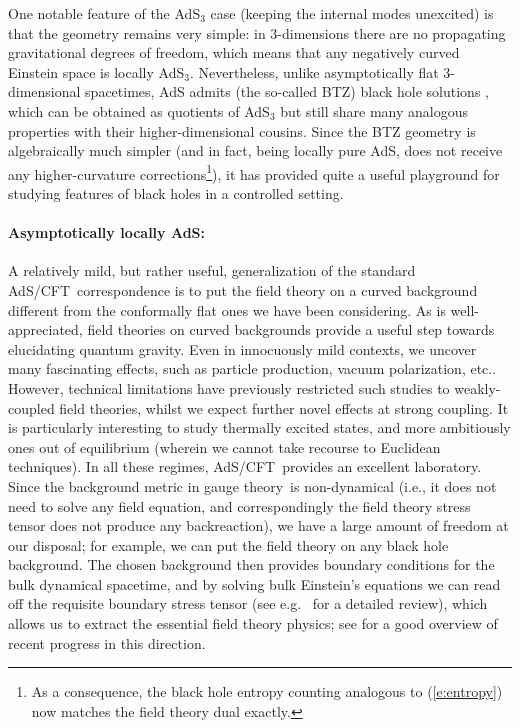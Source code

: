 \documentclass[12pt]{article}
\def\req#1{(\ref{#1})}
\def\AC{AdS/CFT}
\def\GT{gauge theory}
\begin{document}
One notable feature of the AdS$_3$ case (keeping the internal modes unexcited) is that the geometry remains very simple:  in 3-dimensions there are no propagating gravitational degrees of freedom, which means that any negatively curved Einstein space is locally AdS$_3$.  Nevertheless, unlike asymptotically flat 3-dimensional  spacetimes, AdS admits (the so-called BTZ) black hole solutions \cite{Banados:1992wn}, which can be obtained as quotients of AdS$_3$ but still share  many analogous properties with their higher-dimensional cousins.  Since the BTZ geometry is algebraically much simpler (and in fact, being locally pure AdS, does not receive any higher-curvature corrections\footnote{
As a consequence, the black hole entropy counting analogous to \req{e:entropy} now matches the field theory dual exactly.
}), it has provided quite a useful playground for studying features of black holes in a controlled setting.

\paragraph{Asymptotically locally AdS:}  %
A relatively mild, but rather useful, generalization of the standard \AC\ correspondence is to put the field theory on a curved background different from the conformally flat ones we have been considering. 
As is well-appreciated, field theories on curved backgrounds provide a useful step towards  elucidating quantum gravity.  Even in innocuously mild contexts, we uncover many fascinating effects, such as particle production, vacuum polarization, etc..  However, technical limitations have previously restricted such studies to weakly-coupled field theories, whilst we expect further novel effects at strong coupling.  It is particularly interesting to study thermally excited states, and more ambitiously ones out of equilibrium (wherein we cannot take recourse to Euclidean techniques).  In all these regimes, \AC\ provides an excellent laboratory.  Since the background metric in \GT\ is non-dynamical (i.e., it does not need to solve any field equation, and correspondingly the field theory stress tensor does not produce any  backreaction), we have a large amount of freedom at our disposal; for example, we can put the field theory on any black hole background.  The chosen background then provides boundary conditions for the bulk dynamical spacetime, and by solving bulk Einstein's equations we can read off the requisite boundary stress tensor (see e.g.\ \cite{Fischetti:2012rd} for a detailed review), which allows us to extract the essential field theory physics; see \cite{Marolf:2013ioa} for a good overview of recent progress in this direction.
\end{document}
